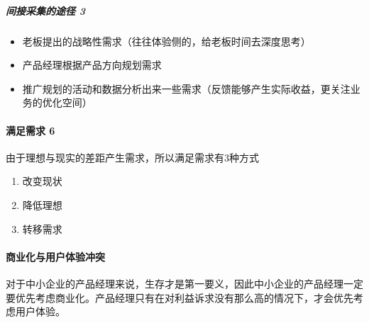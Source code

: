 \documentclass[letterpaper,11pt,english]{sphinxmanual}
\begin{document}
\subparagraph{间接采集的途径 3\sphinxfootnotemark[12]}
\label{\detokenize{chapter_introduction/need:id7}}%
\begin{footnotetext}[12]\sphinxAtStartFootnote
{}
%
\end{footnotetext}\ignorespaces \begin{itemize}
\item {} 
老板提出的战略性需求（往往体验侧的，给老板时间去深度思考）

\item {} 
产品经理根据产品方向规划需求

\item {} 
推广规划的活动和数据分析出来一些需求（反馈能够产生实际收益，更关注业务的优化空间）

\end{itemize}


\paragraph{满足需求 6\sphinxfootnotemark[13]}
\label{\detokenize{chapter_introduction/need:id8}}%
\begin{footnotetext}[13]\sphinxAtStartFootnote
{}
%
\end{footnotetext}\ignorespaces 
由于理想与现实的差距产生需求，所以满足需求有3种方式
\begin{enumerate}
%
\item {} 
改变现状

\item {} 
降低理想

\item {} 
转移需求

\end{enumerate}


\paragraph{商业化与用户体验冲突}
\label{\detokenize{chapter_introduction/need:id9}}
对于中小企业的产品经理来说，生存才是第一要义，因此中小企业的产品经理一定要优先考虑商业化。产品经理只有在对利益诉求没有那么高的情况下，才会优先考虑用户体验。%
\begin{footnote}[14]\sphinxAtStartFootnote
{}
%
\end{footnote}
\end{document}
